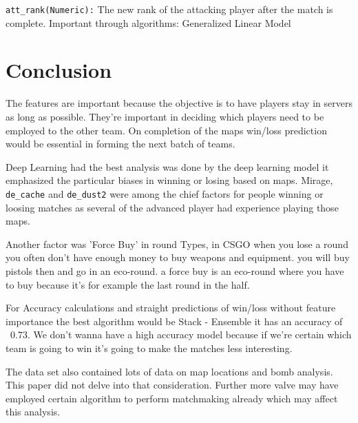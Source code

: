 \documentclass[conference]{IEEEtran}
\begin{document}
     \item \texttt{att\_rank(Numeric):} The new rank of the attacking player after the match is complete.
        Important through algorithms: Generalized Linear Model

\section{Conclusion}

The features are important because the objective is to have players stay in servers as long as possible. They're important in deciding which players need to be employed to the other team. On completion of the maps win/loss prediction would be essential in forming the next batch of teams. 

Deep Learning had the best analysis was done by the deep learning model it emphasized the particular biases in winning or losing based on maps. Mirage, \texttt{de\_cache} and \texttt{de\_dust2} were among the chief factors for people winning or loosing matches as several of the advanced player had experience playing those maps.

Another factor was 'Force Buy' in round Types, in CSGO when you lose a round you often don't have enough money to buy weapons and equipment. you will buy pistols then and go in an eco-round. a force buy is an eco-round where you have to buy because it's for example the last round in the half.

For Accuracy calculations and straight predictions of win/loss without feature importance the best algorithm would be Stack - Ensemble it has an accuracy of ~0.73. We don't wanna have a high accuracy model because if we're certain which team is going to win it's going to make the matches less interesting.

The data set also contained lots of data on map locations and bomb analysis. This paper did not delve into that consideration. Further more valve may have employed certain algorithm to perform matchmaking already which may affect this analysis.

\medskip
 

 
\end{document}

